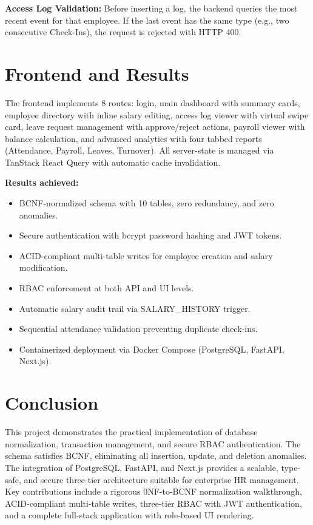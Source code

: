\documentclass[twocolumn,12pt]{article}
\begin{document}
\textbf{Access Log Validation:} Before inserting a log, the backend queries the most recent event for that employee. If the last event has the same type (e.g., two consecutive Check-Ins), the request is rejected with HTTP 400.

\section{Frontend and Results}

The frontend implements 8 routes: login, main dashboard with summary cards, employee directory with inline salary editing, access log viewer with virtual swipe card, leave request management with approve/reject actions, payroll viewer with balance calculation, and advanced analytics with four tabbed reports (Attendance, Payroll, Leaves, Turnover). All server-state is managed via TanStack React Query with automatic cache invalidation.

\textbf{Results achieved:}
\begin{itemize}[leftmargin=*]
    \item BCNF-normalized schema with 10 tables, zero redundancy, and zero anomalies.
    \item Secure authentication with bcrypt password hashing and JWT tokens.
    \item ACID-compliant multi-table writes for employee creation and salary modification.
    \item RBAC enforcement at both API and UI levels.
    \item Automatic salary audit trail via SALARY\_HISTORY trigger.
    \item Sequential attendance validation preventing duplicate check-ins.
    \item Containerized deployment via Docker Compose (PostgreSQL, FastAPI, Next.js).
\end{itemize}

\section{Conclusion}

This project demonstrates the practical implementation of database normalization, transaction management, and secure RBAC authentication. The schema satisfies BCNF, eliminating all insertion, update, and deletion anomalies. The integration of PostgreSQL, FastAPI, and Next.js provides a scalable, type-safe, and secure three-tier architecture suitable for enterprise HR management. Key contributions include a rigorous 0NF-to-BCNF normalization walkthrough, ACID-compliant multi-table writes, three-tier RBAC with JWT authentication, and a complete full-stack application with role-based UI rendering.
\end{document}
